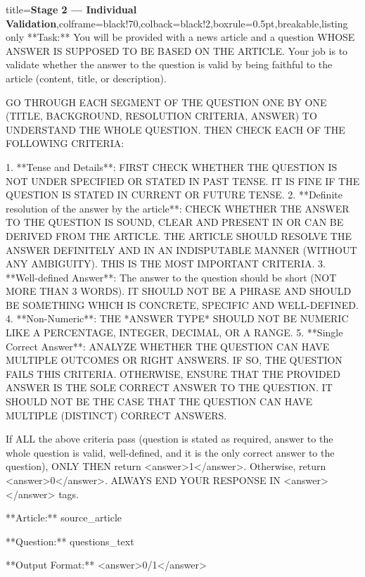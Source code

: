 \begin{tcblisting}{title={\textbf{Stage 2 --- Individual Validation}},colframe=black!70,colback=black!2,boxrule=0.5pt,breakable,listing only}
**Task:** You will be provided with a news article and a question WHOSE ANSWER IS SUPPOSED TO BE BASED ON THE ARTICLE. Your job is to validate whether the answer to the question is valid by being faithful to the article (content, title, or description).

GO THROUGH EACH SEGMENT OF THE QUESTION ONE BY ONE (TITLE, BACKGROUND, RESOLUTION CRITERIA, ANSWER) TO UNDERSTAND THE WHOLE QUESTION. THEN CHECK EACH OF THE FOLLOWING CRITERIA: 

1. **Tense and Details**: FIRST CHECK WHETHER THE QUESTION IS NOT UNDER SPECIFIED OR STATED IN PAST TENSE. IT IS FINE IF THE QUESTION IS STATED IN CURRENT OR FUTURE TENSE. 
2. **Definite resolution of the answer by the article**: CHECK WHETHER THE ANSWER TO THE QUESTION IS SOUND, CLEAR AND PRESENT IN OR CAN BE DERIVED FROM THE ARTICLE. THE ARTICLE SHOULD RESOLVE THE ANSWER DEFINITELY AND IN AN INDISPUTABLE MANNER (WITHOUT ANY AMBIGUITY). THIS IS THE MOST IMPORTANT CRITERIA.
3. **Well-defined Answer**: The answer to the question should be short (NOT MORE THAN 3 WORDS). IT SHOULD NOT BE A PHRASE AND SHOULD BE SOMETHING WHICH IS CONCRETE, SPECIFIC AND WELL-DEFINED.
4. **Non-Numeric**: THE *ANSWER TYPE* SHOULD NOT BE NUMERIC LIKE A PERCENTAGE, INTEGER, DECIMAL, OR A RANGE.
5. **Single Correct Answer**: ANALYZE WHETHER THE QUESTION CAN HAVE MULTIPLE OUTCOMES OR RIGHT ANSWERS. IF SO, THE QUESTION FAILS THIS CRITERIA. OTHERWISE, ENSURE THAT THE PROVIDED ANSWER IS THE SOLE CORRECT ANSWER TO THE QUESTION. IT SHOULD NOT BE THE CASE THAT THE QUESTION CAN HAVE MULTIPLE (DISTINCT) CORRECT ANSWERS.

If ALL the above criteria pass (question is stated as required, answer to the whole question is valid, well-defined, and it is the only correct answer to the question), ONLY THEN return <answer>1</answer>. Otherwise, return <answer>0</answer>. ALWAYS END YOUR RESPONSE IN <answer> </answer> tags.

**Article:**
{source_article}

**Question:**
{questions_text}

**Output Format:**
<answer>0/1</answer>
\end{tcblisting}




